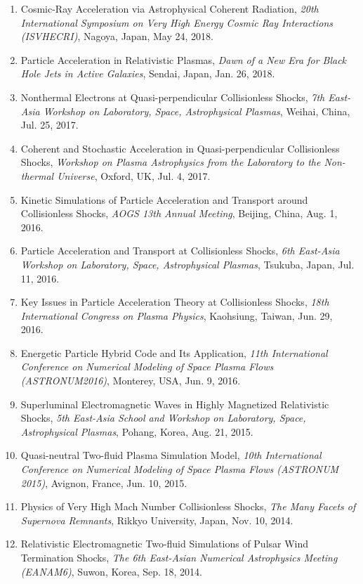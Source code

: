 \documentclass[lualatex,a4paper,ja=standard]{scrartcl}
\newcommand{\TalkEntry}[3]{
\item #1, \textit{#2}, #3.}
\begin{document}
\begin{enumerate}
\TalkEntry
{Cosmic-Ray Acceleration via Astrophysical Coherent Radiation}
{20th International Symposium on Very High Energy Cosmic Ray Interactions (ISVHECRI)}
{Nagoya, Japan, May 24, 2018}

\TalkEntry
{Particle Acceleration in Relativistic Plasmas}
{Dawn of a New Era for Black Hole Jets in Active Galaxies}
{Sendai, Japan, Jan. 26, 2018}

\TalkEntry
{Nonthermal Electrons at Quasi-perpendicular Collisionless Shocks}
{7th East-Asia Workshop on Laboratory, Space, Astrophysical Plasmas}
{Weihai, China, Jul. 25, 2017}

\TalkEntry
{Coherent and Stochastic Acceleration in Quasi-perpendicular Collisionless Shocks}
{Workshop on Plasma Astrophysics from the Laboratory to the Non-thermal Universe}
{Oxford, UK, Jul. 4, 2017}

\TalkEntry
{Kinetic Simulations of Particle Acceleration and Transport around Collisionless Shocks}
{AOGS 13th Annual Meeting}
{Beijing, China, Aug. 1, 2016}

\TalkEntry
{Particle Acceleration and Transport at Collisionless Shocks}
{6th East-Asia Workshop on Laboratory, Space, Astrophysical Plasmas}
{Tsukuba, Japan, Jul. 11, 2016}

\TalkEntry
{Key Issues in Particle Acceleration Theory at Collisionless Shocks}
{18th International Congress on Plasma Physics}
{Kaohsiung, Taiwan, Jun. 29, 2016}

\TalkEntry
{Energetic Particle Hybrid Code and Its Application}
{11th International Conference on Numerical Modeling of Space Plasma Flows (ASTRONUM2016)}
{Monterey, USA, Jun. 9, 2016}

\TalkEntry
{Superluminal Electromagnetic Waves in Highly Magnetized Relativistic Shocks}
{5th East-Asia School and Workshop on Laboratory, Space, Astrophysical Plasmas}
{Pohang, Korea, Aug. 21, 2015}

\TalkEntry
{Quasi-neutral Two-fluid Plasma Simulation Model}
{10th International Conference on Numerical Modeling of Space Plasma Flows (ASTRONUM 2015)}
{Avignon, France, Jun. 10, 2015}

\TalkEntry
{Physics of Very High Mach Number Collisionless Shocks}
{The Many Facets of Supernova Remnants}
{Rikkyo University, Japan, Nov. 10, 2014}

\TalkEntry
{Relativistic Electromagnetic Two-fluid Simulations of Pulsar Wind Termination Shocks}
{The 6th East-Asian Numerical Astrophysics Meeting (EANAM6)}
{Suwon, Korea, Sep. 18, 2014}


\end{enumerate}
\end{document}
